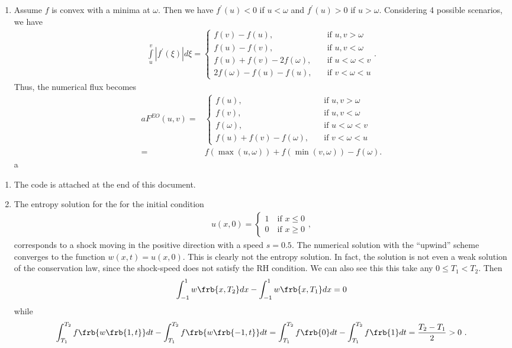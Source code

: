 \documentclass{article}
\begin{document}
\begin{exerciseList}
\begin{enumerate}
\item Assume $f$ is convex with a minima at $\omega$. Then we have $f^\prime(u) < 0$ if $u < \omega$ and $f^\prime(u) > 0$ if $u > \omega$. Considering 4 possible scenarios, we have
\begin{gather}
\int \limits_u^v |f^\prime(\xi) | d \xi = \begin{cases}
f(v) - f(u), & \quad \text{if } u,v > \omega\\
f(u) - f(v), & \quad \text{if } u,v < \omega\\
f(u) + f(v) - 2f(\omega), & \quad \text{if } u < \omega < v \\
2 f(\omega) - f(u) - f(u), & \quad \text{if } v < \omega < u
\end{cases}.
\end{gather}
Thus, the numerical flux becomes 
\begin{gather}a
F^{EO}(u,v) =& \begin{cases}
f(u), & \quad \text{if } u,v > \omega\\
f(v), & \quad \text{if } u,v < \omega\\
f(\omega), & \quad \text{if } u < \omega < v \\
f(u) + f(v) - f(\omega), & \quad \text{if } v < \omega < u
\end{cases}\\
=& f(\max(u,\omega)) + f(\min(v,\omega)) - f(\omega).
\end{gather}a

\end{enumerate}


\item
\begin{enumerate}

\item The code is attached at the end of this document.
\item The entropy solution for the for the initial condition
\begin{gather}
u(x,0) = \begin{cases} 1 \quad \text{if } x\leq 0 \\0 \quad \text{if } x\geq 0 \end{cases},
\end{gather}
corresponds to a shock moving in the positive direction with a speed $s=0.5$.
The numerical solution with the ``upwind'' scheme converges to the function $w(x,t)=u(x,0)$. This is clearly not the entropy solution. In fact, the solution is not even a weak solution of the conservation law, since the shock-speed does not satisfy the RH condition. We can also see this
this take any $0\leq T_{1}<T_{2}$. Then 
\begin{gather}
	\int_{-1}^{1}w\frb{x,T_{2}}dx-\int_{-1}^{1}w\frb{x,T_{1}}dx=0
\end{gather}
while
\begin{gather}
	\int_{T_{1}}^{T_{2}}f\frb{w\frb{1,t}}dt -\int_{T_{1}}^{T_{2}}f\frb{w\frb{-1,t}}dt
		=\int_{T_{1}}^{T_{2}}f\frb{0}dt-\int_{T_{1}}^{T_{2}}f\frb{1}dt
		=\frac{T_{2}-T_{1}}{2}>0\ .
\end{gather}


\end{enumerate}
\end{exerciseList}
\end{document}
